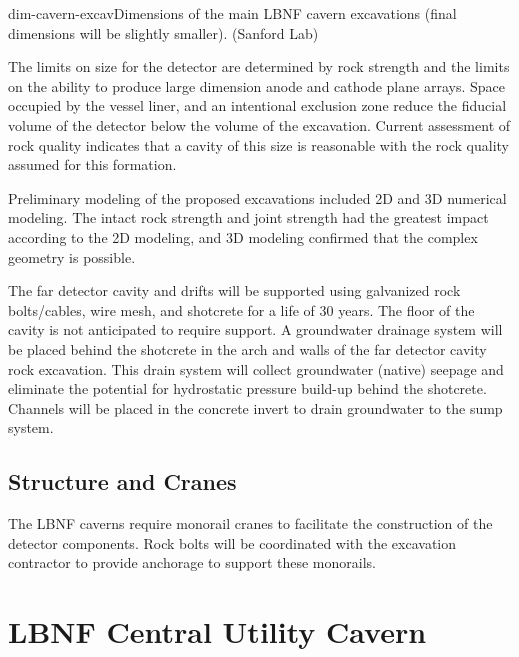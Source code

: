 \begin{cdrfigure}{dim-cavern-excav}{Dimensions of the main LBNF cavern excavations (final dimensions will be slightly smaller). (Sanford Lab)}
\end{cdrfigure}

The limits on size for the detector are determined by rock strength and the limits on the ability to produce large dimension anode and cathode plane arrays. Space occupied by the vessel liner, and an intentional exclusion zone reduce the fiducial volume of the detector below the volume of the excavation. Current assessment of rock quality indicates that a cavity of this size is reasonable with the rock quality assumed for this formation.

Preliminary modeling of the proposed excavations included 2D and 3D numerical modeling. The intact rock strength and joint strength had the greatest impact according to the 2D modeling, and 3D modeling confirmed that the complex geometry is possible. 

The far detector cavity and drifts will be supported using galvanized rock bolts/cables, wire mesh, and shotcrete for a life of 30 years. The floor of the cavity is not anticipated to require support. 
A groundwater drainage system will be placed behind the shotcrete in the arch and walls of the far detector cavity rock excavation. This drain system will collect groundwater (native) seepage and eliminate the potential for hydrostatic pressure build-up behind the shotcrete. Channels will be placed in the concrete invert to drain groundwater to the sump system. 

\subsection{Structure and Cranes}
\label{sec:fscf-excav-cranes}

The LBNF caverns require monorail cranes to facilitate the construction of the detector components.  Rock bolts will be coordinated with the excavation contractor to provide anchorage to support these monorails.

\section{LBNF Central Utility Cavern}
\label{sec:fscf-excav-util-cav}


